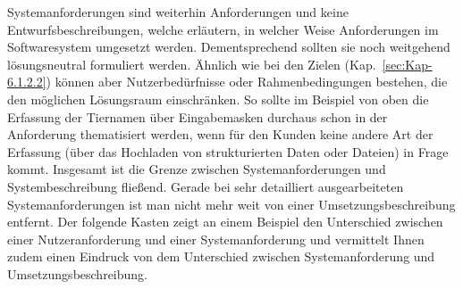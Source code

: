 \vspace{2mm} %


\vspace{\baselineskip} %

Systemanforderungen sind weiterhin Anforderungen und keine Entwurfsbeschreibungen, welche erläutern, in welcher Weise Anforderungen im Softwaresystem umgesetzt werden. Dementsprechend sollten sie noch weitgehend lösungsneutral formuliert werden. Ähnlich wie bei den Zielen (Kap.~\ref{sec:Kap-6.1.2.2}) können aber Nutzer\-bedürfnisse oder Rahmenbedingungen bestehen, die den möglichen Lösungsraum einschränken. So sollte im Beispiel von oben die Erfassung der Tiernamen über Eingabemasken durchaus schon in der Anforderung thematisiert werden, wenn für den Kunden keine andere Art der Erfassung (\zb über das Hochladen von strukturierten Daten oder Dateien) in Frage kommt. Insgesamt ist die Grenze zwischen System\-anforderungen und Systembeschreibung fließend. Gerade bei sehr detailliert ausgearbeiteten Systemanforderungen ist man nicht mehr weit von einer Umsetzungs\-beschreibung entfernt. Der folgende Kasten zeigt an einem Beispiel den Unterschied zwischen einer Nutzeranforderung und einer Systemanforderung und vermittelt \mbox{Ihnen} zudem einen Eindruck von dem Unterschied zwischen Systemanforderung und Umsetzungsbeschreibung.

\pagebreak %

